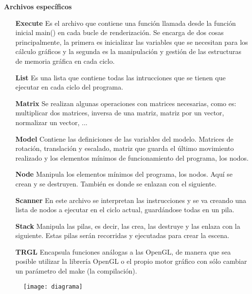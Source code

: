 \newpage

\textbf{Archivos específicos}
\begin{itemize}
	\item [\textbf{Execute}] Es el archivo que contiene una función llamada desde la función inicial main() en cada bucle de renderización. Se encarga de dos cosas principalmente, la primera es inicializar las variables que se necesitan para los cálculo gráficos y la segunda es la manipulación y gestión de las estructuras de memoria gráfica en cada ciclo.
	\item [\textbf{List}] Es una lista que contiene todas las intrucciones que se tienen que ejecutar en cada ciclo del programa.
	\item [\textbf{Matrix}] Se realizan algunas operaciones con matrices necesarias, como es: multiplicar dos matrices, inversa de una matriz, matriz por un vector, normalizar un vector, ...
	\item [\textbf{Model}] Contiene las definiciones de las variables del modelo. Matrices de rotación, translación y escalado, matriz que guarda el último movimiento realizado y los elementos mínimos de funcionamiento del programa, los nodos.
	\item [\textbf{Node}] Manipula los elementos mínimos del programa, los nodos. Aquí se crean y se destruyen. También es donde se enlazan con el siguiente.
	\item [\textbf{Scanner}] En este archivo se interpretan las instrucciones y se va creando una lista de nodos a ejecutar en el ciclo actual, guardándose todas en un pila.
	\item [\textbf{Stack}] Manipula las pilas, es decir, las crea, las destruye y las enlaza con la siguiente. Estas pilas serán recorridas y ejecutadas para crear la escena.
	\item [\textbf{TRGL}] Encapsula funciones análogas a las OpenGL, de manera que sea posible utilizar la librería OpenGL o el propio motor gráfico con sólo cambiar un parámetro del make (la compilación).
\end{itemize}



\begin{figure}[h]
 \centering
 \texttt{[image: diagrama]}
\end{figure}

